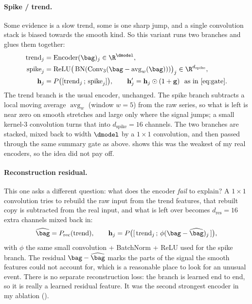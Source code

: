 \paragraph{Spike / trend.}
Some evidence is a slow trend, some is one sharp jump, and a single convolution stack is biased
towards the smooth kind. So this variant runs two branches and glues them together:
\begin{align}
  \text{trend}_j &= \text{Encoder}(\bag)_j \in \R^{\dmodel} ,
  \label{eq:spike_trend}\\
  \text{spike}_j &= \operatorname{ReLU}\!\big(\operatorname{BN}(\operatorname{Conv}_3(
  \bag - \operatorname{avg}_w(\bag)))\big)_j \in \R^{d_{\text{spike}}} ,
  \label{eq:spike_branch}\\
  \mathbf{h}_j &= P\big([\text{trend}_j \,;\, \text{spike}_j]\big),
  \qquad
  \mathbf{h}'_j = \mathbf{h}_j \odot (1 + \mathbf{g}) \ \text{ as in \Cref{eq:gate}} .
  \label{eq:spike_mix}
\end{align}
The trend branch is the usual encoder, unchanged. The spike branch subtracts a local moving average
$\operatorname{avg}_w$ (window $w = 5$) from the raw series, so what is left is near zero on smooth
stretches and large only where the signal jumps; a small kernel-3 convolution turns that into
$d_{\text{spike}} = 16$ channels. The two branches are stacked, mixed back to width $\dmodel$ by a
$1\times1$ convolution, and then passed through the same summary gate as above.
 shows this was the weakest of my real encoders, so the idea did not pay
off.

\paragraph{Reconstruction residual.}
This one asks a different question: what does the encoder \emph{fail} to explain? A $1\times1$
convolution tries to rebuild the raw input from the trend features, that rebuilt copy is subtracted
from the real input, and what is left over becomes $d_{\text{res}} = 16$ extra channels mixed back
in:
\begin{equation}
  \widehat{\bag} = P_{\text{rec}}(\text{trend}), \qquad
  \mathbf{h}_j = P\big([\,\text{trend}_j \,;\, \phi(\bag - \widehat{\bag})_j\,]\big),
  \label{eq:recon}
\end{equation}
with $\phi$ the same small convolution + BatchNorm + ReLU used for the spike branch. The residual
$\bag - \widehat{\bag}$ marks the parts of the signal the smooth features could not account for,
which is a reasonable place to look for an unusual event. There is no separate reconstruction loss:
the branch is learned end to end, so it is really a learned residual feature. It was the second
strongest encoder in my ablation ().

